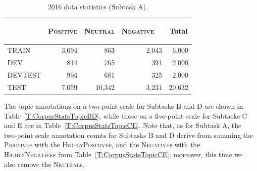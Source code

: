 \documentclass[11pt,letterpaper]{article}
\begin{document}
\begin{table}[tbh]
  \small
  \begin{center}
    \resizebox{\columnwidth}{!} {
    \begin{tabular}{|l|rrr|r|}
      \hline
      \bf & \multicolumn{1}{c}{\begin{sideways}\textsc{Positive}\end{sideways}} & \multicolumn{1}{c}{\begin{sideways}\textsc{Neutral}\end{sideways}} & \multicolumn{1}{c|}{\begin{sideways}\textsc{Negative~~}\end{sideways}} & \multicolumn{1}{c|}{\begin{sideways}\bf Total\end{sideways}}\\
      \hline
      TRAIN & 3,094 & 863 & 2,043 & 6,000 \\
      DEV & \phantom{0}844 & 765 & \phantom{0}391 & 2,000 \\
      DEVTEST & \phantom{0}994 & 681 & \phantom{0}325 & 2,000 \\
      TEST & 7,059 & 10,342 & 3,231 & 20,632 \\
      \hline
    \end{tabular}
    }
    \caption{2016 data statistics (Subtask A).}
    \label{T:CorpusStats}
  \end{center}
\end{table}

The topic annotations on a two-point scale for Subtasks B and D are
shown in Table~\ref{T:CorpusStatsTopicBD}, while those on a five-point
scale for Subtasks C and E are in
Table~\ref{T:CorpusStatsTopicCE}. Note that, as for Subtask A, the
two-point scale annotation counts for Subtasks B and D derive from
summing the \textsc{Positive}s with the \textsc{HighlyPositive}s, and
the \textsc{Negative}s with the \textsc{HighlyNegative}s from
Table~\ref{T:CorpusStatsTopicCE}; moreover, this time we also remove
the \textsc{Neutral}s.
\end{document}
